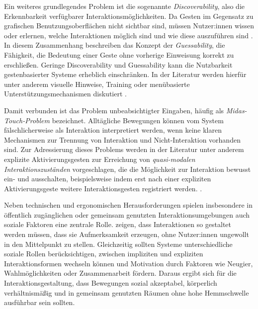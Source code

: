 Ein weiteres grundlegendes Problem ist die sogenannte \textit{Discoverability}, also die Erkennbarkeit verfügbarer Interaktionsmöglichkeiten. Da Gesten im Gegensatz zu grafischen Benutzungsoberflächen nicht sichtbar sind, müssen Nutzer:innen wissen oder erlernen, welche Interaktionen möglich sind und wie diese auszuführen sind \parencite{vogiatzidakis2018gestureeliticationstudiesreview}. In diesem Zusammenhang beschreiben \textcite{wobbrock2005discoverability} das Konzept der \textit{Guessability}, die Fähigkeit, die Bedeutung einer Geste ohne vorherige Einweisung korrekt zu erschließen. Geringe Discoverability und Guessability kann die Nutzbarkeit gestenbasierter Systeme erheblich einschränken. In der Literatur werden hierfür unter anderem visuelle Hinweise, Training oder menübasierte Unterstützungsmechanismen diskutiert \parencite{gavgiotaki2023gesturebasedinteractionforarsystemsreview}.

Damit verbunden ist das Problem unbeabsichtigter Eingaben, häufig als \textit{Midas-Touch-Problem} bezeichnet. Alltägliche Bewegungen können vom System fälschlicherweise als Interaktion interpretiert werden, wenn keine klaren Mechanismen zur Trennung von Interaktion und Nicht-Interaktion vorhanden sind. Zur Adressierung dieses Problems werden in der Literatur unter anderem explizite Aktivierungsgesten zur Erreichung von \textit{quasi-modalen Interaktions\-zuständen} vorgeschlagen, die die Möglichkeit zur Interaktion bewusst ein- und ausschalten, beispielsweise indem erst nach einer expliziten Aktivierungsgeste weitere Interaktionsgesten registriert werden.
\parencite{walterBaillyValkanova2014CuenesicsUsingMidAirGesturesToSelectItemsOnInteractivePublicDisplays}.

Neben technischen und ergonomischen Herausforderungen spielen insbesondere in öffentlich zugänglichen oder gemeinsam genutzten Interaktionsumgebungen auch soziale Faktoren eine zentrale Rolle. \textcite{mueller2010requirementsAndDesignSpaceForInteractivePublicDisplays} zeigen, dass Interaktionen so gestaltet werden müssen, dass sie Aufmerksamkeit erzeugen, ohne Nutzer:innen ungewollt in den Mittelpunkt zu stellen. Gleichzeitig sollten Systeme unterschiedliche soziale Rollen berücksichtigen, zwischen impliziten und expliziten Interaktionsformen wechseln können und Motivation durch Faktoren wie Neugier, Wahlmöglichkeiten oder Zusammenarbeit fördern.
Daraus ergibt sich für die Interaktionsgestaltung, dass Bewegungen sozial akzeptabel, körperlich verhältnismäßig und in gemeinsam genutzten Räumen ohne hohe Hemmschwelle ausführbar sein sollten. 

